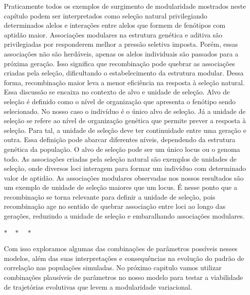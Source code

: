 Praticamente todos os exemplos de surgimento de modularidade mostrados
neste capítulo podem ser interpretados como seleção natural
privilegiando determinados alelos e interações entre alelos que formem
de fenótipos com aptidão maior.
Associações modulares na estrutura genética e aditiva são privilegiadas
por responderem melhor a pressão seletiva imposta.
Porém, essas associações não são herdáveis, apenas os alelos individuais
são passados para a próxima geração.
Isso significa que recombinação pode quebrar as associações criadas pela
seleção, dificultando o estabelecimento da estrutura modular.
Dessa forma, recombinação maior leva a menor eficiência na resposta à
seleção natural.
Essa discussão se encaixa no contexto de alvo e unidade de seleção.
Alvo de seleção é definido como o nível de organização que apresenta o
fenótipo sendo selecionado.
No nosso caso o indivíduo é o único alvo de seleção.
Já a unidade de seleção se refere ao nível de organização genética que
permite prever a resposta à seleção.
Para tal, a unidade de seleção deve ter continuidade entre uma geração e
outra.
Essa definição pode abarcar diferentes níveis, dependendo da estrutura
genética da população.
O alvo de seleção pode ser um único locus ou o genoma todo.
As associações criadas pela seleção natural são exemplos de unidades de
seleção, onde diversos loci interagem para formar um indivíduo com
determinado valor de aptidão.
As associações modulares observadas nos nossos resultados são um
exemplo de unidade de seleção maiores que um locus.
É nesse ponto que a recombinação se torna relevante para definir a
unidade de seleção, pois recombinação age no sentido de quebrar
associação entre loci ao longo das gerações, reduzindo a unidade de
seleção e embaralhando associações modulares.

\centerline { $ * \quad * \quad * $ }

Com isso exploramos algumas das combinações de parâmetros possíveis
nesses modelos, além das suas interpretações e consequências na evolução
do padrão de correlação nas populações simuladas.
No próximo capitulo vamos utilizar combinações plausíveis de parâmetros
no nosso modelo para testar a viabilidade de trajetórias evolutivas que
levem a modularidade variacional.

